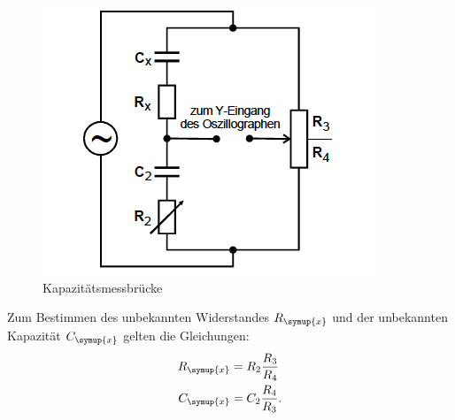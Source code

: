 \begin{figure}
  \centering
  \includegraphics[scale=0.7]{Kapa.PNG}
  \caption{Kapazitätsmessbrücke \cite{Quelle}}
  \label{Abb3}
\end{figure}
Zum Bestimmen des unbekannten Widerstandes $R_\symup{x}$ und der unbekannten Kapazität
$C_\symup{x}$ gelten die Gleichungen:
\begin{align*}
  R_\symup{x} &= R_2 \frac{R_3}{R_4} \\
  C_\symup{x} &= C_2 \frac{R_4}{R_3} .
\end{align*}
\FloatBarrier

